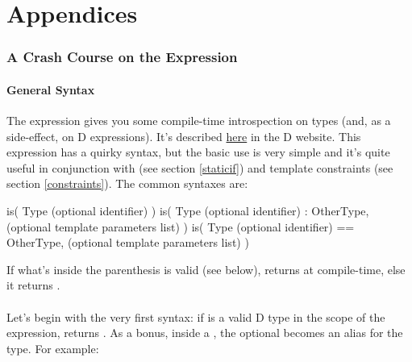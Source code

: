 \newpage
\part*{Appendices}
\appendix

\section{
\texorpdfstring{A Crash Course on the  Expression}
               {A Crash Course on the is(...) expression}}
\label{isexpression}

\subsection{General Syntax} \label{issyntax}

The  expression gives you some compile-time introspection on types (and, as a side-effect, on D expressions). It's described \href{http://www.dlang.org/expression.html#IsExpression}{here} in the D website. This expression has a quirky syntax, but the basic use is very simple and it's quite useful in conjunction with  (see section \ref{staticif}) and template constraints (see section \ref{constraints}). The common syntaxes are:

\begin{dcode}
is( Type (optional identifier) )
is( Type (optional identifier) :  OtherType, 
         (optional template parameters list) )
is( Type (optional identifier) == OtherType, 
         (optional template parameters list) )
\end{dcode}

If what's inside the parenthesis is valid (see below), \DD{()} returns  at compile-time, else it returns .

\subsection{\texorpdfstring{}
                           {is(Type)}}
\label{istype}

Let's begin with the very first syntax: if  is a valid D type in the scope of the  expression, \DD{()} returns . As a bonus, inside a , the optional  becomes an alias for the type. For example:

